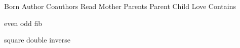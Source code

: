 
\DefRel Born
\DefRel Author
\DefRel Coauthors
\DefRel Read
\DefRel Mother
\DefRel Parents
\DefRel Parent
\DefRel Child
\DefRel Love
\DefRel Contains

\DefFun even
\DefFun odd
\DefFun fib

\DefFun square
\DefFun double
\DefFun inverse

\def\Smile{\rel{\ddot\smile}}
\def\Frown{\rel{\ddot\frown}}

\def\oddAs#1{A_{[#1]}}


